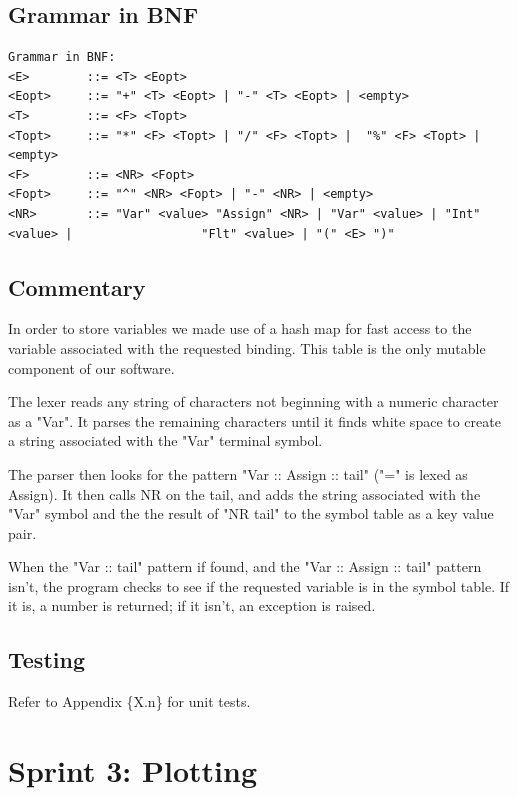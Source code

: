 \documentclass[a4paper, oneside, 11pt]{report}
\begin{document}
	\subsection{Grammar in BNF}
	\begin{verbatim}
Grammar in BNF:
<E>        ::= <T> <Eopt>
<Eopt>     ::= "+" <T> <Eopt> | "-" <T> <Eopt> | <empty>
<T>        ::= <F> <Topt>
<Topt>     ::= "*" <F> <Topt> | "/" <F> <Topt> |  "%" <F> <Topt> |<empty>
<F>        ::= <NR> <Fopt>
<Fopt>     ::= "^" <NR> <Fopt> | "-" <NR> | <empty>
<NR>       ::= "Var" <value> "Assign" <NR> | "Var" <value> | "Int" <value> |                  "Flt" <value> | "(" <E> ")"

	\end{verbatim}

	\subsection{Commentary}
	In order to store variables we made use of a hash map for fast access to the variable associated with the requested binding. This table is the only mutable component of our software.

	The lexer reads any string of characters not beginning with a numeric character as a "Var". It parses the remaining characters until it finds white space to create a string associated with the "Var" terminal symbol.

	The parser then looks for the pattern "Var :: Assign :: tail" ("=" is lexed as Assign). It then calls NR on the tail, and adds the string associated with the "Var" symbol and the the result of "NR tail" to the symbol table as a key value pair.

	When the "Var :: tail" pattern if found, and the "Var :: Assign :: tail" pattern isn't, the program checks to see if the requested variable is in the symbol table. If it is, a number is returned; if it isn't, an exception is raised.

	\subsection{Testing}
	Refer to Appendix \{X.n\} for unit tests.

	\clearpage
	\section{Sprint 3: Plotting}
\end{document}
